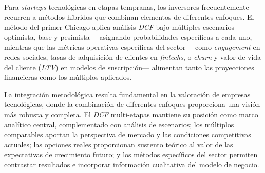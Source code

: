 Para \emph{startups} tecnológicas en etapas tempranas, los inversores frecuentemente recurren a métodos híbridos que combinan elementos de diferentes enfoques. El método del primer Chicago aplica análisis \emph{DCF} bajo múltiples escenarios ---optimista, base y pesimista--- asignando probabilidades específicas a cada uno, mientras que las métricas operativas específicas del sector ---como \emph{engagement} en redes sociales, tasas de adquisición de clientes en \emph{fintechs}, o \emph{churn} y valor de vida del cliente (\emph{LTV}) en modelos de suscripción--- alimentan tanto las proyecciones financieras como los múltiplos aplicados.

La integración metodológica resulta fundamental en la valoración de empresas tecnológicas, donde la combinación de diferentes enfoques proporciona una visión más robusta y completa. El \emph{DCF} multi-etapas mantiene su posición como marco analítico central, complementado con análisis de escenarios; los múltiplos comparables aportan la perspectiva de mercado y las condiciones competitivas actuales; las opciones reales proporcionan sustento teórico al valor de las expectativas de crecimiento futuro; y los métodos específicos del sector permiten contrastar resultados e incorporar información cualitativa del modelo de negocio. 